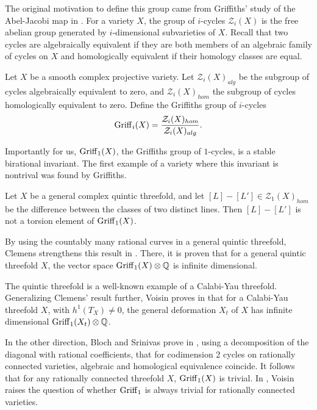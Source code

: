 The original motivation to define this group came from Griffiths' study of the Abel-Jacobi map in \cite{GriffithsPeriodsAlgebraicI}. For a variety $X$, the group of $i$-cycles $\mathcal{Z}_i(X)$ is the free abelian group generated by $i$-dimensional subvarieties of $X$. Recall that two cycles are algebraically equivalent if they are both members of an algebraic family of cycles on $X$ and homologically equivalent if their homology classes are equal.
\begin{definition}
	Let $X$ be a smooth complex projective variety. Let $\mathcal{Z}_i(X)_{alg}$ be the subgroup of cycles algebraically equivalent to zero, and $\mathcal{Z}_i(X)_{hom}$ the subgroup of cycles homologically equivalent to zero. Define the Griffiths group of $i$-cycles
	\[\operatorname{Griff}_i(X) = \frac{\mathcal{Z}_i(X)_{hom}}{\mathcal{Z}_i(X)_{alg}}. \]
\end{definition}
Importantly for us, $\operatorname{Griff}_1(X)$, the Griffiths group of $1$-cycles, is a stable birational invariant. The first example of a variety where this invariant is nontrival was found by Griffiths.

\begin{theorem}
	Let $X$ be a general complex quintic threefold, and let $[L]-[L'] \in \mathcal{Z}_1(X)_{hom}$ be the difference between the classes of two distinct lines. Then $[L]-[L']$ is not a torsion element of $\operatorname{Griff}_1(X)$.
\end{theorem}
By using the countably many rational curves in a general quintic threefold, Clemens strengthens this result in \cite{ClemensNotFinitelyGenerated}. There, it is proven that for a general quintic threefold $X$, the vector space $\operatorname{Griff}_1(X) \otimes \mathbb{Q}$ is infinite dimensional.

The quintic threefold is a well-known example of a Calabi-Yau threefold. Generalizing Clemens' result further, Voisin proves in \cite{VoisinGriffithsCalabi-Yau} that for a Calabi-Yau threefold $X$, with $h^1(T_X) \neq 0$, the general deformation $X_t$ of $X$ has infinite dimensional $\operatorname{Griff}_1(X_t) \otimes \mathbb{Q}$.

In the other direction, Bloch and Srinivas prove in \cite{BSCorrespondences}, using a decomposition of the diagonal with rational coefficients, that for codimension 2 cycles on rationally connected varieties, algebraic and homological equivalence coincide. It follows that for any rationally connected threefold $X$, $\operatorname{Griff}_1(X)$ is trivial. In \cite{VoisinDoD}, Voisin raises the question of whether $\operatorname{Griff}_1$ is always trivial for rationally connected varieties.

